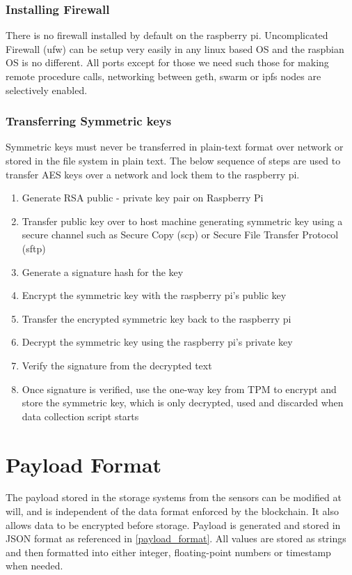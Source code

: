 \documentclass[11pt,openright]{report}
\begin{document}
\subsubsection{Installing Firewall}
There is no firewall installed by default on the raspberry pi. Uncomplicated Firewall (ufw) can be setup very easily in any linux based OS and the raspbian OS is no different. All ports except for those we need such those for making remote procedure calls, networking between geth, swarm or ipfs nodes are selectively enabled.

\subsubsection{Transferring Symmetric keys}
Symmetric keys must never be transferred in plain-text format over network or stored in the file system in plain text. The below sequence of steps are used to transfer AES keys over a network and lock them to the raspberry pi.
\newpage
\begin{enumerate}
	\item Generate RSA public - private key pair on Raspberry Pi
	\item Transfer public key over to host machine generating symmetric key using a secure channel such as Secure Copy (scp) or Secure File Transfer Protocol (sftp)
	\item Generate a signature hash for the key
	\item Encrypt the symmetric key with the raspberry pi's public key
	\item Transfer the encrypted symmetric key back to the raspberry pi
	\item Decrypt the symmetric key using the raspberry pi's private key
	\item Verify the signature from the decrypted text
	\item Once signature is verified, use the one-way key from TPM to encrypt and store the symmetric key, which is only decrypted, used and discarded when data collection script starts
\end{enumerate}

\section{Payload Format} \label{ss:payload format}
The payload stored in the storage systems from the sensors can be modified at will, and is independent of the data format enforced by the blockchain. It also allows data to be encrypted before storage. Payload is generated and stored in JSON format as referenced in \ref{payload_format}. All values are stored as strings and then formatted into either integer, floating-point numbers or timestamp when needed.
\newpage
\end{document}
